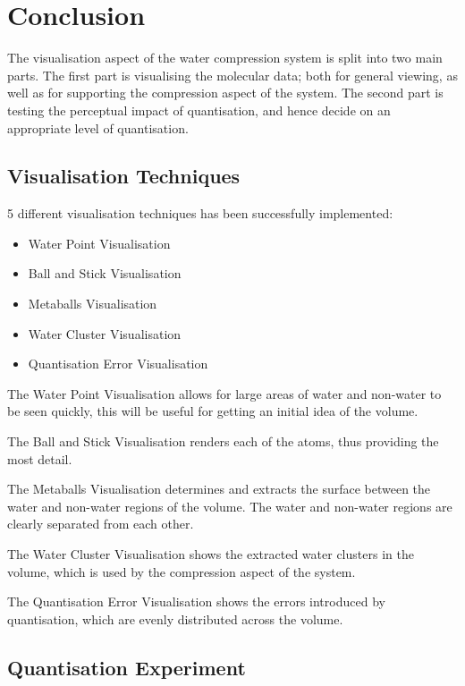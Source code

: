 \chapter{Conclusion}
\label{cha:conclusion}

The visualisation aspect of the water compression system is split into two main
parts. The first part is visualising the molecular data; both for general
viewing, as well as for supporting the compression aspect of the system. The
second part is testing the perceptual impact of quantisation, and hence decide
on an appropriate level of quantisation.

\section{Visualisation Techniques}
\label{sec:conclusion_visualisation}

5 different visualisation techniques has been successfully implemented:
\begin{itemize}
  \item Water Point Visualisation
  \item Ball and Stick Visualisation
  \item Metaballs Visualisation
  \item Water Cluster Visualisation
  \item Quantisation Error Visualisation
\end{itemize}

The Water Point Visualisation allows for large areas of water and non-water to
be seen quickly, this will be useful for getting an initial idea of the volume.

The Ball and Stick Visualisation renders each of the atoms, thus providing the
most detail.

The Metaballs Visualisation determines and extracts the surface between the
water and non-water regions of the volume. The water and non-water regions are
clearly separated from each other.

The Water Cluster Visualisation shows the extracted water clusters in the
volume, which is used by the compression aspect of the system.

The Quantisation Error Visualisation shows the errors introduced by
quantisation, which are evenly distributed across the volume.


\section{Quantisation Experiment}
\label{sec:conclustion_experiment}

